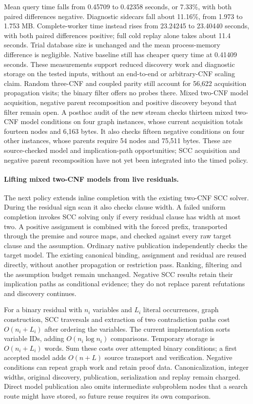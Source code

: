 \documentclass[11pt,a4paper]{article}
\numberwithin{equation}{section}
\theoremstyle{plain}
\theoremstyle{definition}
\theoremstyle{remark}
\begin{document}
Mean query time falls from 0.45709 to 0.42358 seconds, or 7.33\%, with both
paired differences negative. Diagnostic sidecars fall about 11.16\%, from
1.973 to 1.753 MB. Complete-worker time instead rises from 23.24245 to
23.40440 seconds, with both paired differences positive; full cold replay
alone takes about 11.4 seconds. Trial database size is unchanged and the mean
process-memory difference is negligible. Native baseline still has cheaper
query time at 0.41409 seconds. These measurements support reduced discovery
work and diagnostic storage on the tested inputs, without an end-to-end or
arbitrary-CNF scaling claim. Random three-CNF and coupled parity still account
for 56,622 acquisition propagation visits; the binary filter offers no probes
there. Mixed two-CNF model acquisition, negative parent recomposition and
positive discovery beyond that filter remain open. A posthoc audit of the new
stream checks thirteen mixed two-CNF model conditions on four graph instances,
whose current acquisition totals fourteen nodes and 6,163 bytes. It also checks
fifteen negative conditions on four other instances, whose parents require
54 nodes and 75,511 bytes. These are source-checked model and implication-path
opportunities; SCC acquisition and negative parent recomposition have not yet
been integrated into the timed policy.

\paragraph{Lifting mixed two-CNF models from live residuals.}
The next policy extends inline completion with the existing two-CNF SCC
solver. During the residual sign scan it also checks clause width. A failed
uniform completion invokes SCC solving only if every residual clause has
width at most two. A positive assignment is combined with the forced prefix,
transported through the premise and source maps, and checked against every
raw target clause and the assumption. Ordinary native publication independently
checks the target model. The existing canonical binding, assignment and residual
are reused directly, without another propagation or restriction pass. Ranking,
filtering and the assumption budget remain unchanged. Negative SCC results
retain their implication paths as conditional evidence; they do not replace
parent refutations and discovery continues.

For a binary residual with $n_i$ variables and $L_i$ literal occurrences,
graph construction, SCC traversals and extraction of two contradiction paths
cost $O(n_i+L_i)$ after ordering the variables. The current implementation sorts
variable IDs, adding $O(n_i\log n_i)$ comparisons. Temporary storage is
$O(n_i+L_i)$ words. Sum these costs over attempted binary conditions; a first
accepted model adds $O(n+L)$ source transport and verification. Negative
conditions can repeat graph work and retain proof data. Canonicalization,
integer widths, original discovery, publication, serialization and replay
remain charged. Direct model publication also omits intermediate subproblem
nodes that a search route might have stored, so future reuse requires its own
comparison.
\end{document}
